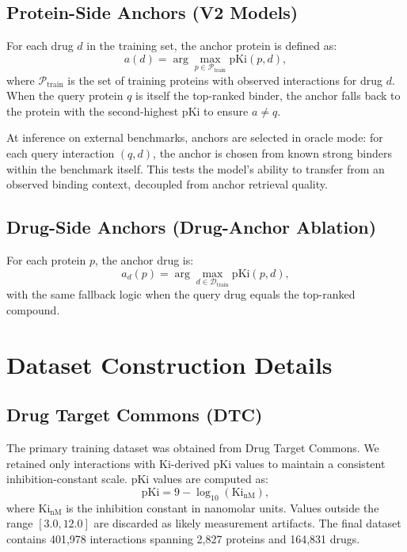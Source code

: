 \documentclass[11pt]{article}
\begin{document}
\subsection{Protein-Side Anchors (V2 Models)}

For each drug $d$ in the training set, the anchor protein is defined as:
\[
a(d) = \arg\max_{p \in \mathcal{P}_{\mathrm{train}}} \mathrm{pKi}(p, d),
\]
where $\mathcal{P}_{\mathrm{train}}$ is the set of training proteins with observed interactions for drug $d$. When the query protein $q$ is itself the top-ranked binder, the anchor falls back to the protein with the second-highest pKi to ensure $a \neq q$.

At inference on external benchmarks, anchors are selected in oracle mode: for each query interaction $(q, d)$, the anchor is chosen from known strong binders within the benchmark itself. This tests the model's ability to transfer from an observed binding context, decoupled from anchor retrieval quality.

\subsection{Drug-Side Anchors (Drug-Anchor Ablation)}

For each protein $p$, the anchor drug is:
\[
a_d(p) = \arg\max_{d \in \mathcal{D}_{\mathrm{train}}} \mathrm{pKi}(p, d),
\]
with the same fallback logic when the query drug equals the top-ranked compound.

\section{Dataset Construction Details}
\label{sec:datasets}

\subsection{Drug Target Commons (DTC)}

The primary training dataset was obtained from Drug Target Commons. We retained only interactions with Ki-derived pKi values to maintain a consistent inhibition-constant scale. pKi values are computed as:
\[
\mathrm{pKi} = 9 - \log_{10}(\mathrm{Ki}_{\mathrm{nM}}),
\]
where $\mathrm{Ki}_{\mathrm{nM}}$ is the inhibition constant in nanomolar units. Values outside the range $[3.0, 12.0]$ are discarded as likely measurement artifacts. The final dataset contains 401,978 interactions spanning 2,827 proteins and 164,831 drugs.
\end{document}

